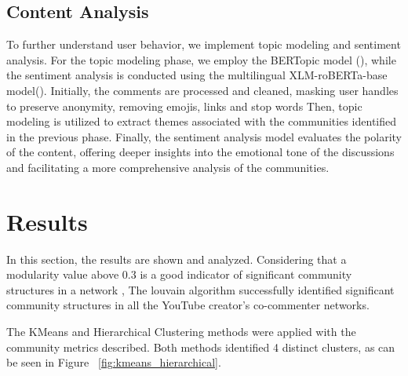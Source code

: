 \documentclass[12pt]{article}
\begin{document}
\subsection{Content Analysis}

To further understand user behavior, we implement
topic modeling and sentiment analysis. For the topic modeling phase, we employ the BERTopic model 
(\cite{bertopic2022}), while the sentiment analysis is conducted using the multilingual 
XLM-roBERTa-base model(\cite{barbieri-etal-2022-xlm}). 
Initially, the comments are processed and cleaned, masking user handles to preserve anonymity,
removing emojis, links and stop words
Then, topic modeling is utilized to extract themes associated with the communities identified in the 
previous phase. Finally, the sentiment analysis model evaluates the polarity of the content, 
offering deeper insights into the emotional tone of the discussions and facilitating a more 
comprehensive analysis of the communities.

\section{Results}

In this section, the results are shown and analyzed.
Considering that a modularity value above 0.3 is a good indicator of significant
community structures in a network \cite{PhysRevE.70.066111}, The louvain algorithm successfully 
identified significant community structures in all the YouTube creator's co-commenter networks.

The KMeans and Hierarchical Clustering methods were applied with the community metrics described. 
Both methods identified 4 distinct clusters, as can be seen in Figure ~\ref{fig:kmeans_hierarchical}.
\end{document}
